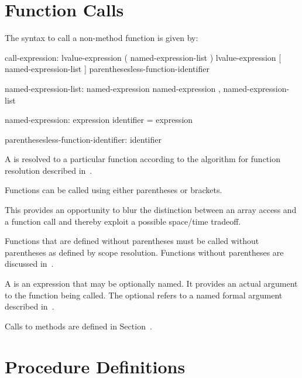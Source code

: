 \section{Function Calls}
\label{Function_Calls}

The syntax to call a non-method function is given by:
\begin{syntax}
call-expression:
  lvalue-expression ( named-expression-list )
  lvalue-expression [ named-expression-list ]
  parenthesesless-function-identifier

named-expression-list:
  named-expression
  named-expression , named-expression-list

named-expression:
  expression
  identifier = expression

parenthesesless-function-identifier:
  identifier
\end{syntax}


A  is resolved to a particular function
according to the algorithm for function resolution described
in~.

Functions can be called using either parentheses or brackets.

\begin{rationale}
This provides an opportunity to blur the distinction between
an array access and a function call and thereby exploit a
possible space/time tradeoff.
\end{rationale}

Functions that are defined without parentheses must be called without
parentheses as defined by scope resolution.  Functions without
parentheses are discussed in~.

A  is an expression that may be optionally
named.  It provides
an actual argument to the function being called.
The optional  refers to a named formal
argument described in~.

Calls to methods are defined in Section~.


\section{Procedure Definitions}
\label{Function_Definitions}

